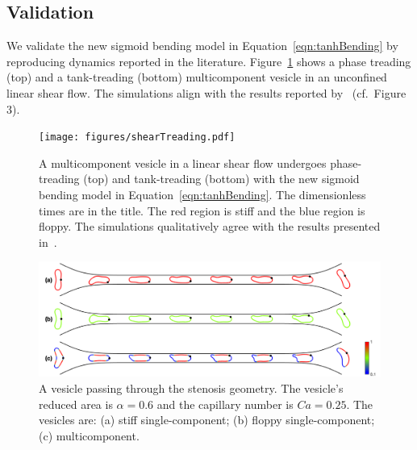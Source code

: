 \documentclass[twoside,twocolumn,9pt]{article}
\newcommand{\subfigimg}[3][,]{%
  \setbox1=\hbox{\texttt{[image: \#3]}}%
  \leavevmode\rlap{\usebox1}%
  \rlap{\hspace*{0pt}\raisebox{\dimexpr\ht1-0\baselineskip}{\bf
  \normalsize #2}}%
  \phantom{\usebox1}%
}
\begin{document}
\subsection{Validation}
\label{sec:validation}
We validate the new sigmoid bending model in
Equation~\eqref{eqn:tanhBending} by reproducing dynamics reported in the
literature. Figure~\ref{fig:treading} shows a phase treading (top) and a
tank-treading (bottom) multicomponent vesicle in an unconfined linear
shear flow. The simulations align with the results reported
by~\citet{liu-mar-li-vee-low2017} (cf.~Figure 3).
\begin{figure}[h]
  \centering
  \texttt{[image: figures/shearTreading.pdf]}
  \caption{\label{fig:treading} \small A multicomponent vesicle in a
  linear shear flow undergoes phase-treading (top) and tank-treading
  (bottom) with the new sigmoid bending model in
  Equation~\eqref{eqn:tanhBending}. The dimensionless times are in the
  title. The red region is stiff and the blue region is floppy. The
  simulations qualitatively agree with the results presented
  in~\citet{liu-mar-li-vee-low2017}.}
\end{figure}


\begin{figure}[h]
  \centering
  \includegraphics[width=0.9\linewidth]{figures/STENOSIS_RAp6MCp5.pdf}
  \caption{\label{fig:RA6} \small A vesicle passing through the stenosis
  geometry. The vesicle's reduced area is $\alpha = 0.6$ and the
  capillary number is $Ca = 0.25$. The vesicles are: (a) stiff
  single-component; (b) floppy single-component; (c) multicomponent.}
\end{figure}
\end{document}
